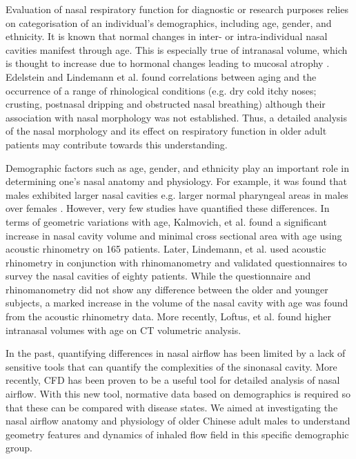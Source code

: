 Evaluation of nasal respiratory function for diagnostic or research purposes relies on categorisation of an individual's demographics, including age, gender, and ethnicity. It is known that normal changes in inter- or intra-individual nasal cavities manifest through age. This is especially true of intranasal volume, which is thought to increase due to hormonal changes leading to mucosal atrophy \cite{Kalmovich2005, Lindemann2010}. Edelstein \cite{Edelstein1996}  and Lindemann et al. \cite{Lindemann2008}  found correlations between aging and the occurrence of a range of rhinological conditions (e.g. dry cold itchy noses; crusting, postnasal dripping and obstructed nasal breathing) although their association with nasal morphology was not established. Thus, a detailed analysis of the nasal morphology and its effect on respiratory function in older adult patients may contribute towards this understanding.

Demographic factors such as age, gender, and ethnicity play an important role in
determining one’s nasal anatomy and physiology. For example, it was found that males exhibited larger nasal cavities e.g. larger normal pharyngeal areas in males over females \cite{Huang1998, BROOKS1992}. However, very few studies have quantified these differences. In terms of geometric variations with age, Kalmovich, et al. \cite{Kalmovich2005} found a significant increase in nasal cavity volume and minimal cross sectional area with age using acoustic rhinometry on 165 patients. Later, Lindemann, et al. \cite{Lindemann2010} used acoustic rhinometry in conjunction with rhinomanometry and validated questionnaires to survey the nasal cavities of eighty patients. While the questionnaire and rhinomanometry did not show any difference between the older and younger subjects, a marked increase in the volume of the nasal cavity with age was found from the acoustic rhinometry data. More recently, Loftus, et al. \cite{Loftus2016}  found higher intranasal volumes with age on CT volumetric analysis.

In the past, quantifying differences in nasal airflow has been limited by a lack of sensitive tools that can quantify the complexities of the sinonasal cavity. More recently, CFD has been proven to be a useful tool for detailed analysis of nasal airflow. With this new tool, normative data based on demographics is required so that these can be compared with disease states. We aimed at investigating the nasal airflow anatomy and physiology of older Chinese adult males to understand geometry features and dynamics of inhaled flow field in this specific demographic group.

